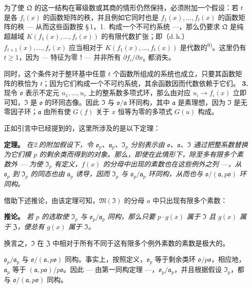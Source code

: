 \documentclass[11pt]{article}
\begin{document}
为了使 $\mathfrak{Q}$ 的这一结构在幂级数或其商的情形仍然保持，必须附加一个假设：若 $t$ 是各 $f_i(x)$ 的函数矩阵的秩，并且例如它同时也是 $f_1(x),\ldots,f_t(x)$ 的函数矩阵的秩 --- 从而这些函数按 \S\,1，1.\ 构成一个不可约系统 ---，那么仍要求 $\mathfrak{Q}$ 是纯超越域 $K(f_1(x),\ldots,f_t(x))$ 的有限代数扩张；即（d.\,h.）$f_{t+1}(x),\ldots,f_r(x)$ 应当相对于 $K(f_1(x),\ldots,f_t(x))$ 是代数的\textsuperscript{9)}。这里仍有 $t \geq 1$，因为 --- 特征为零！--- 并非所有 $\partial f_i/\partial x_k$ 都消失。

同时，这个条件对于整环基中任意 $t$ 个函数所组成的系统也成立，只要其函数矩阵的秩恰为 $t$；因为它们构成一个不可约系统，其余函数因而代数依赖于它们。
\medskip\noindent\textbf{3.}
现令 $\mathfrak{o}$ 表示不定元 $u_1,\ldots,u_r$ 上的整系数多项式环，那么由对应 $u_i \to f_i(x)$ 立即可知，$\mathfrak{I}$ 是 $\mathfrak{o}$ 的环同态像。因此 $\mathfrak{I}$ 与 $\mathfrak{o}/\mathfrak{a}$ 环同构，其中 $\mathfrak{a}$ 是素理想，因为 $\mathfrak{I}$ 是无零因子环；$\mathfrak{a}$ 由所有使 $G(f)$ 关于 $x$ 恒等为零的多项式 $G(u)$ 构成。

正如引言中已经提到的，这里所涉及的是以下定理：

\medskip\noindent\textbf{定理。}
\textit{在2.的附加假设下，令 $\mathfrak{o}_p$、$\mathfrak{a}_p$、$\mathfrak{I}_p$ 分别表示由 $\mathfrak{o}$、$\mathfrak{a}$、$\mathfrak{I}$ 通过把整系数替换为它们模 $p$ 的剩余类而得到的对象。那么，即使在此情形下，除至多有限多个素数外 --- 为使 $\mathfrak{I}_p$ 有定义，$f(x)$ 的分母中出现的素数也在这些例外之列 ---，从 $\mathfrak{o}_p$ 到 $\mathfrak{I}_p$ 的同态也由 $\mathfrak{a}_p$ 诱导，因而 $\mathfrak{I}_p$ 与 $\mathfrak{o}_p/\mathfrak{a}_p$ 环同构，从而也与 $\mathfrak{o}/(\mathfrak{a}, p\mathfrak{o})$ 环同构。}

借助下述推论，由该定理可知，$\mathfrak{M}(\mathfrak{I})$ 的分母 $a$ 中只出现有限多个素数：

\medskip\noindent\textbf{推论。}
\textit{若 $p$ 的选取使 $\mathfrak{I}_p$ 与 $\mathfrak{o}_p/\mathfrak{a}_p$ 同构，那么只要 $p \cdot g(x)$ 属于 $\mathfrak{I}$ 且 $g(x)$ 属于 $\mathfrak{Z}$，便总有 $g(x)$ 属于 $\mathfrak{I}$。}

换言之，$\mathfrak{I}$ 在 $\mathfrak{Z}$ 中相对于所有不同于这有限多个例外素数的素数是极大的。

$\mathfrak{o}_p/\mathfrak{a}_p$ 与 $\mathfrak{o}/(\mathfrak{a}, p\mathfrak{o})$ 同构。事实上，按照定义，$\mathfrak{o}_p$ 等于剩余类环 $\mathfrak{o}/p\mathfrak{o}$，相应地，$\mathfrak{a}_p$ 等于 $(\mathfrak{a}, p\mathfrak{o})/p\mathfrak{o}$。因此 --- 由第一同构定理 ---，$\mathfrak{o}_p/\mathfrak{a}_p$，并且根据假设 $\mathfrak{I}_p$，都与 $\mathfrak{o}/(\mathfrak{a}, p\mathfrak{o})$ 同构。
\end{document}
